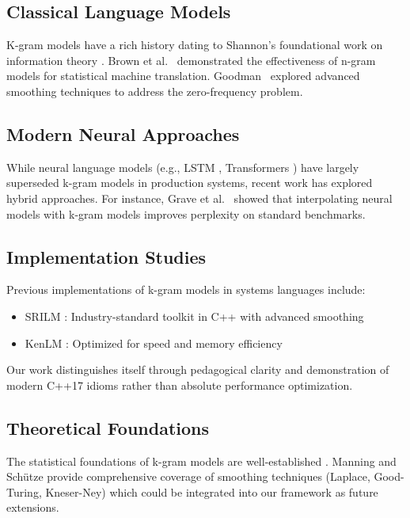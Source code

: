 \documentclass[11pt,letterpaper]{article}
\begin{document}
\subsection{Classical Language Models}

K-gram models have a rich history dating to Shannon's foundational work on information theory \cite{shannon1948mathematical}. Brown et al.~\cite{brown1992class} demonstrated the effectiveness of n-gram models for statistical machine translation. Goodman~\cite{goodman2001bit} explored advanced smoothing techniques to address the zero-frequency problem.

\subsection{Modern Neural Approaches}

While neural language models (e.g., LSTM \cite{hochreiter1997long}, Transformers \cite{vaswani2017attention}) have largely superseded k-gram models in production systems, recent work has explored hybrid approaches. For instance, Grave et al.~\cite{grave2016improving} showed that interpolating neural models with k-gram models improves perplexity on standard benchmarks.

\subsection{Implementation Studies}

Previous implementations of k-gram models in systems languages include:
\begin{itemize}
    \item SRILM \cite{stolcke2002srilm}: Industry-standard toolkit in C++ with advanced smoothing
    \item KenLM \cite{heafield2011kenlm}: Optimized for speed and memory efficiency
\end{itemize}

Our work distinguishes itself through pedagogical clarity and demonstration of modern C++17 idioms rather than absolute performance optimization.

\subsection{Theoretical Foundations}

The statistical foundations of k-gram models are well-established \cite{jurafsky2009speech}. Manning and Schütze \cite{manning1999foundations} provide comprehensive coverage of smoothing techniques (Laplace, Good-Turing, Kneser-Ney) which could be integrated into our framework as future extensions.
\end{document}

